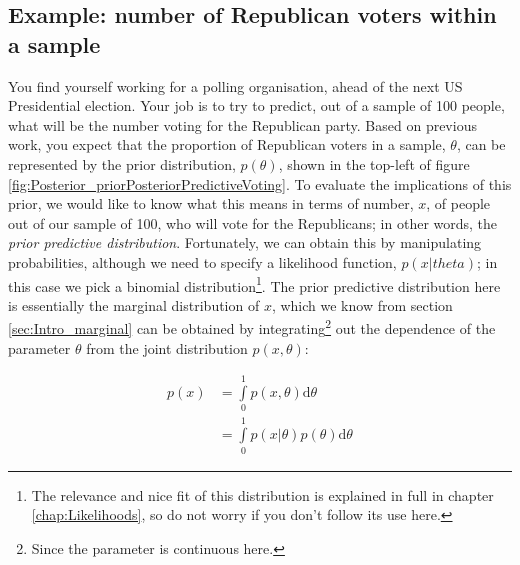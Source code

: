 \documentclass[11pt,fullpage]{book}
\begin{document}
\subsection{Example: number of Republican voters within a sample}
You find yourself working for a polling organisation, ahead of the next US Presidential election. Your job is to try to predict, out of a sample of 100 people, what will be the number voting for the Republican party. Based on previous work, you expect that the proportion of Republican voters in a sample, $\theta$, can be represented by the prior distribution, $p(\theta)$, shown in the top-left of figure \ref{fig:Posterior_priorPosteriorPredictiveVoting}. To evaluate the implications of this prior, we would like to know what this means in terms of number, $x$, of people out of our sample of 100, who will vote for the Republicans; in other words, the \textit{prior predictive distribution}. Fortunately, we can obtain this by manipulating probabilities, although we need to specify a likelihood function, $p(x|theta)$; in this case we pick a binomial distribution\footnote{The relevance and nice fit of this distribution is explained in full in chapter \ref{chap:Likelihoods}, so do not worry if you don't follow its use here.}. The prior predictive distribution here is essentially the marginal distribution of $x$, which we know from section \ref{sec:Intro_marginal} can be obtained by integrating\footnote{Since the parameter is continuous here.} out the dependence of the parameter $\theta$ from the joint distribution $p(x,\theta)$:

\begin{equation}\label{eq:Posterior_priorPredictiveVoting}
\begin{align}
p(x) &= \int\limits_{0}^{1} p(x,\theta) \mathrm{d}\theta\\
&= \int\limits_{0}^{1} p(x|\theta) p(\theta) \mathrm{d}\theta
\end{align}
\end{equation}
\end{document}

